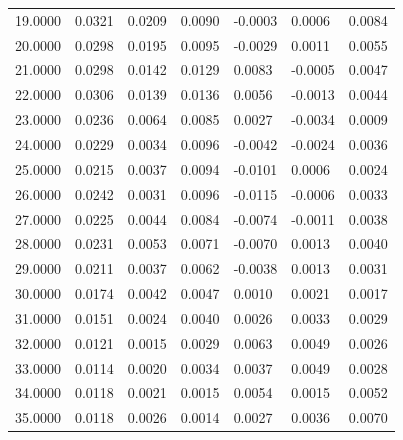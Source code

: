 \begin{footnotesize}
\begin{longtable}{lllllll}
19.0000 & 0.0321 & 0.0209 & 0.0090 & -0.0003 & 0.0006 & 0.0084 \\
20.0000 & 0.0298 & 0.0195 & 0.0095 & -0.0029 & 0.0011 & 0.0055 \\
21.0000 & 0.0298 & 0.0142 & 0.0129 & 0.0083 & -0.0005 & 0.0047 \\
22.0000 & 0.0306 & 0.0139 & 0.0136 & 0.0056 & -0.0013 & 0.0044 \\
23.0000 & 0.0236 & 0.0064 & 0.0085 & 0.0027 & -0.0034 & 0.0009 \\
24.0000 & 0.0229 & 0.0034 & 0.0096 & -0.0042 & -0.0024 & 0.0036 \\
25.0000 & 0.0215 & 0.0037 & 0.0094 & -0.0101 & 0.0006 & 0.0024 \\
26.0000 & 0.0242 & 0.0031 & 0.0096 & -0.0115 & -0.0006 & 0.0033 \\
27.0000 & 0.0225 & 0.0044 & 0.0084 & -0.0074 & -0.0011 & 0.0038 \\
28.0000 & 0.0231 & 0.0053 & 0.0071 & -0.0070 & 0.0013 & 0.0040 \\
29.0000 & 0.0211 & 0.0037 & 0.0062 & -0.0038 & 0.0013 & 0.0031 \\
30.0000 & 0.0174 & 0.0042 & 0.0047 & 0.0010 & 0.0021 & 0.0017 \\
31.0000 & 0.0151 & 0.0024 & 0.0040 & 0.0026 & 0.0033 & 0.0029 \\
32.0000 & 0.0121 & 0.0015 & 0.0029 & 0.0063 & 0.0049 & 0.0026 \\
33.0000 & 0.0114 & 0.0020 & 0.0034 & 0.0037 & 0.0049 & 0.0028 \\
34.0000 & 0.0118 & 0.0021 & 0.0015 & 0.0054 & 0.0015 & 0.0052 \\
35.0000 & 0.0118 & 0.0026 & 0.0014 & 0.0027 & 0.0036 & 0.0070 \\
\end{longtable}
\end{footnotesize}
